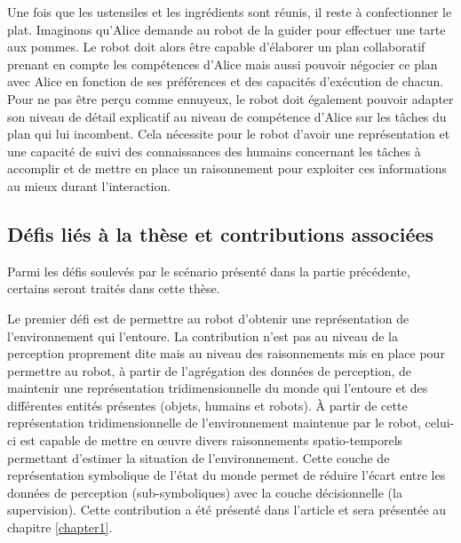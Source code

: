 \documentclass[a4paper,11pt,twoside]{StyleThese}
\begin{document}
Une fois que les ustensiles et les ingrédients sont réunis, il reste à confectionner le plat. Imaginons qu'Alice demande au robot de la guider pour effectuer une tarte aux pommes. Le robot doit alors être capable d'élaborer un plan collaboratif prenant en compte les compétences d'Alice mais aussi pouvoir négocier ce plan avec Alice en fonction de ses préférences et des capacités d'exécution de chacun.
Pour ne pas être perçu comme ennuyeux, le robot doit également pouvoir adapter son niveau de détail explicatif au niveau de compétence d'Alice sur les tâches du plan qui lui incombent.
Cela nécessite pour le robot d'avoir une représentation et une capacité de suivi des connaissances des humains concernant les tâches à accomplir et de mettre en place un raisonnement pour exploiter ces informations au mieux durant l'interaction.




\subsection{Défis liés à la thèse et contributions associées}
Parmi les défis soulevés par le scénario présenté dans la partie précédente, certains seront traités dans cette thèse.

Le premier défi est de permettre au robot d'obtenir une représentation de l'environnement qui l'entoure. La contribution n'est pas au niveau de la perception proprement dite mais au niveau des raisonnements mis en place pour permettre au robot, à partir de l'agrégation des données de perception, de maintenir une représentation tridimensionnelle du monde qui l'entoure et des différentes entités présentes (objets, humains et robots). À partir de cette représentation tridimensionnelle de l'environnement maintenue par le robot, celui-ci est capable  de mettre en œuvre divers raisonnements spatio-temporels permettant d'estimer la situation de l'environnement. Cette couche de représentation symbolique de l'état du monde permet de réduire l'écart entre les données de perception (sub-symboliques) avec la couche décisionnelle (la supervision). Cette contribution a été présenté dans l'article \cite{Milliez2014} et sera présentée au chapitre \ref{chapter1}.
\end{document}
